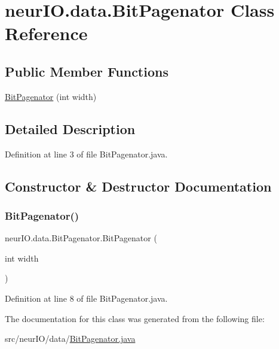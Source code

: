 \hypertarget{classneur_i_o_1_1data_1_1_bit_pagenator}{}\section{neur\+I\+O.\+data.\+Bit\+Pagenator Class Reference}
\label{classneur_i_o_1_1data_1_1_bit_pagenator}
\subsection*{Public Member Functions}
\begin{DoxyCompactItemize}
\item 
\hyperlink{classneur_i_o_1_1data_1_1_bit_pagenator_a83d98001fc92aebbf5cd7d230c70ba57}{Bit\+Pagenator} (int width)
\end{DoxyCompactItemize}


\subsection{Detailed Description}


Definition at line 3 of file Bit\+Pagenator.\+java.



\subsection{Constructor \& Destructor Documentation}
\mbox{\label{classneur_i_o_1_1data_1_1_bit_pagenator_a83d98001fc92aebbf5cd7d230c70ba57}} 
\subsubsection{\texorpdfstring{Bit\+Pagenator()}{BitPagenator()}}
{\footnotesize\ttfamily neur\+I\+O.\+data.\+Bit\+Pagenator.\+Bit\+Pagenator (\begin{DoxyParamCaption}\item[{int}]{width }\end{DoxyParamCaption})}



Definition at line 8 of file Bit\+Pagenator.\+java.



The documentation for this class was generated from the following file\+:\begin{DoxyCompactItemize}
\item 
src/neur\+I\+O/data/\hyperlink{_bit_pagenator_8java}{Bit\+Pagenator.\+java}\end{DoxyCompactItemize}
